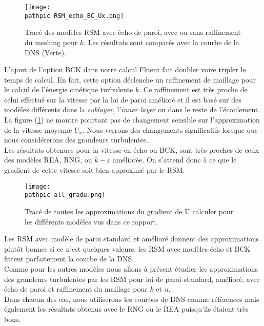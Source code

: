 \documentclass[a4paper,10pt]{article}
\newcommand\pathpic{/home/saura/Documents/Latex_files/Pic/}
\newcommand{\keps}{$k-\varepsilon$}
\begin{document}
  \pagebreak
  
  \begin{figure}[ht!]
  \centering
  \texttt{[image: \\pathpic RSM\_echo\_BC\_Ux.png]}
  \caption{Tracé des modèles RSM avec écho de paroi, avec ou sans raffinement du meshing pour $k$. Les résultats sont comparés avec la courbe de la DNS (Verte).}
  \label{RSM_echo_BC_U}
  \end{figure}
  
\noindent L'ajout de l'option BCK dans notre calcul Fluent fait doubler voire tripler le temps de calcul. En fait, cette option déclenche un raffinement de maillage pour le calcul de l'énergie cinétique turbulente $k$. Ce raffinement est très proche de celui effectué sur la vitesse par la loi de paroi amélioré et il est basé sur des modèles différents dans la \textit{sublayer}, l'\textit{inner layer} ou dans le reste de l'écoulement. La figure (\ref{RSM_echo_BC_U}) ne montre pourtant pas de changement sensible sur l'approximation de la vitesse moyenne $U_x$. Nous verrons des changements significatifs lorsque que nous considérerons des grandeurs turbulentes.\\
Les résultats obtenues pour la vitesse en écho ou BCK, sont très proches de ceux des modèles REA, RNG, ou \keps $ $ améliorée. On s'attend donc à ce que le gradient de cette vitesse soit bien approximé par le RSM.

\begin{figure}[ht!]
\centering
\texttt{[image: \\pathpic all\_gradu.png]}
\caption{Tracé de toutes les approximations du gradient de U calculer pour les différents modèles vus dans ce rapport. }
\label{all_gradu}
\end{figure}

\noindent Les RSM avec modèle de paroi standard et amélioré donnent des approximations plutôt bonnes si ce n'est quelques valeurs, les RSM avec modèles écho et BCK fittent parfaitement la courbe de la DNS. \\
Comme pour les autres modèles nous allons à présent étudier les approximations des grandeurs turbulentes par les RSM pour loi de paroi standard, amélioré, avec écho de paroi et raffinement du maillage pour $k$ et $u$.\\
 Dans chacun des cas, nous utiliserons les courbes de DNS comme références mais également les résultats obtenus avec le RNG ou le REA puisqu'ils étaient très bons.\\
 
 \pagebreak
 
\end{document}
